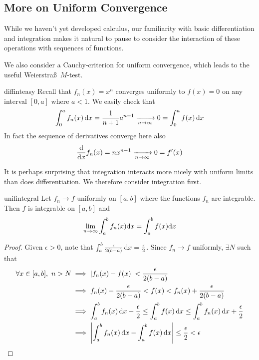 \subsection{More on Uniform Convergence}\label{sec:unifconvmore}

While we haven't yet developed calculus, our familiarity with basic differentiation and integration makes it natural to pause to consider the interaction of these operations with sequences of functions.\smallbreak

We also consider a Cauchy-criterion for uniform convergence, which leads to the useful Weierstraß\ $M$-test.

\begin{example}{}{diffinteasy}
Recall that $f_n(x)=x^n$ converges uniformly to $f(x)=0$ on any interval $[0,a]$ where $a<1$. We easily check that
  \[\int_0^af_n(x)\,{\mathrm{d} x}=\frac 1{n+1}a^{n+1}\xrightarrow[n\to\infty]{} 0 =\int_0^af(x)\,{\mathrm{d} x}\]
  In fact the sequence of derivatives converge here also
  \[\frac{\mathrm{d} }{\mathrm{d} x}f_n(x)=nx^{n-1} \xrightarrow[n\to\infty]{} 0 =f'(x)\]
\end{example}

It is perhaps surprising that integration interacts more nicely with uniform limits than does differentiation. We therefore consider integration first.

\begin{thm}{}{unifintegral}
Let $f_n\to f$ uniformly on $[a,b]$ where the functions $f_n$ are integrable. Then $f$ is integrable on $[a,b]$ and
\[\lim_{n\to\infty}\int_a^bf_n(x){\mathrm{d} x}=\int_a^bf(x){\mathrm{d} x}\]
\end{thm}

\begin{proof}
Given $\epsilon>0$, note that $\int_a^b\frac\epsilon{2(b-a)}\,{\mathrm{d} x}=\frac\epsilon 2$. Since $f_n\to f$ uniformly, $\exists N$ such that\footnotemark
\begin{align*}
\forall x\in [a,b],\ n>N&\implies \left| f_n(x)-f(x)\right|<\frac\epsilon{2(b-a)}\\
&\implies f_n(x)-\frac\epsilon{2(b-a)}<f(x)< f_n(x)+\frac\epsilon{2(b-a)}\\
&\implies \int_a^b f_n(x)\,{\mathrm{d} x}-\frac\epsilon 2\le \int_a^bf(x)\,{\mathrm{d} x}\le \int_a^b f_n(x)\,{\mathrm{d} x}+\frac\epsilon 2\\
&\implies \left| \int_a^bf_n(x)\,{\mathrm{d} x}-\int_a^bf(x)\,{\mathrm{d} x}\right|\le \frac\epsilon 2<\epsilon\tag*{\qedhere}
\end{align*}
\end{proof}


